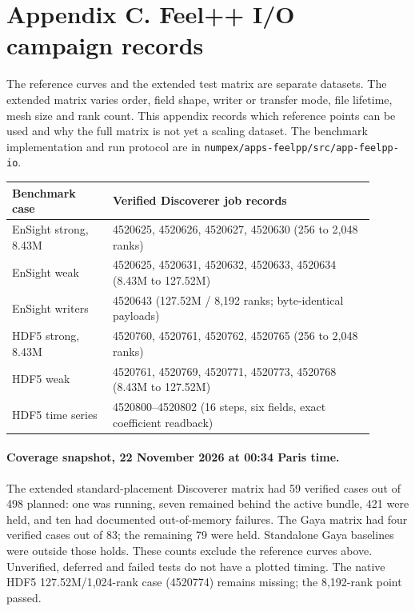 \clearpage
\section*{Appendix C. Feel++ I/O campaign records}
\label{sec:appendix-feelpp-io}

The reference curves and the extended test matrix are separate datasets.
The extended matrix varies order, field shape, writer or transfer mode,
file lifetime, mesh size and rank count. This appendix records which
reference points can be used and why the full matrix is not yet a scaling
dataset. The benchmark implementation and run protocol are in
\nolinkurl{numpex/apps-feelpp/src/app-feelpp-io}.

\begin{center}
\small
\begin{tabular}{@{}p{0.25\linewidth}p{0.65\linewidth}@{}}
\toprule
Benchmark case & Verified Discoverer job records \\
\midrule
EnSight strong, 8.43M & 4520625, 4520626, 4520627, 4520630 (256 to 2,048 ranks) \\
EnSight weak & 4520625, 4520631, 4520632, 4520633, 4520634 (8.43M to 127.52M) \\
EnSight writers & 4520643 (127.52M / 8,192 ranks; byte-identical payloads) \\
HDF5 strong, 8.43M & 4520760, 4520761, 4520762, 4520765 (256 to 2,048 ranks) \\
HDF5 weak & 4520761, 4520769, 4520771, 4520773, 4520768 (8.43M to 127.52M) \\
HDF5 time series & 4520800--4520802 (16 steps, six fields, exact coefficient readback) \\
\bottomrule
\end{tabular}
\end{center}

\paragraph{Coverage snapshot, 22 November 2026 at 00:34 Paris time.}
The extended standard-placement Discoverer matrix had 59 verified cases out
of 498 planned: one was running, seven remained behind the active bundle,
421 were held, and ten had documented out-of-memory failures. The Gaya
matrix had four verified cases out of 83; the remaining 79 were held.
Standalone Gaya baselines were outside those holds. These counts exclude
the reference curves above. Unverified, deferred and failed tests do not
have a plotted timing. The native HDF5 127.52M/1,024-rank case (4520774)
remains missing; the 8,192-rank point passed.


